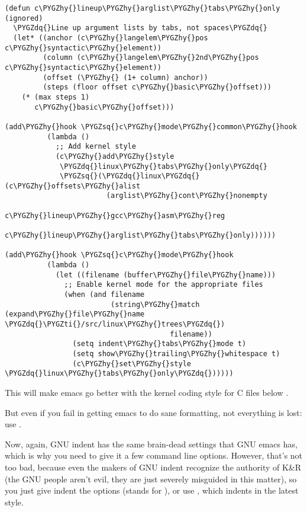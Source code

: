 \documentclass[a4paper,8pt,english]{sphinxmanual}
\def\PYGZhy{\char`\-}
\def\PYGZsq{\char`\'}
\def\PYGZdq{\char`\"}
\def\PYGZti{\char`\~}
\renewcommand\PYGZsq{\textquotesingle}
\begin{document}
\begin{Verbatim}[commandchars=\\\{\}]
(defun c\PYGZhy{}lineup\PYGZhy{}arglist\PYGZhy{}tabs\PYGZhy{}only (ignored)
  \PYGZdq{}Line up argument lists by tabs, not spaces\PYGZdq{}
  (let* ((anchor (c\PYGZhy{}langelem\PYGZhy{}pos c\PYGZhy{}syntactic\PYGZhy{}element))
         (column (c\PYGZhy{}langelem\PYGZhy{}2nd\PYGZhy{}pos c\PYGZhy{}syntactic\PYGZhy{}element))
         (offset (\PYGZhy{} (1+ column) anchor))
         (steps (floor offset c\PYGZhy{}basic\PYGZhy{}offset)))
    (* (max steps 1)
       c\PYGZhy{}basic\PYGZhy{}offset)))

(add\PYGZhy{}hook \PYGZsq{}c\PYGZhy{}mode\PYGZhy{}common\PYGZhy{}hook
          (lambda ()
            ;; Add kernel style
            (c\PYGZhy{}add\PYGZhy{}style
             \PYGZdq{}linux\PYGZhy{}tabs\PYGZhy{}only\PYGZdq{}
             \PYGZsq{}(\PYGZdq{}linux\PYGZdq{} (c\PYGZhy{}offsets\PYGZhy{}alist
                        (arglist\PYGZhy{}cont\PYGZhy{}nonempty
                         c\PYGZhy{}lineup\PYGZhy{}gcc\PYGZhy{}asm\PYGZhy{}reg
                         c\PYGZhy{}lineup\PYGZhy{}arglist\PYGZhy{}tabs\PYGZhy{}only))))))

(add\PYGZhy{}hook \PYGZsq{}c\PYGZhy{}mode\PYGZhy{}hook
          (lambda ()
            (let ((filename (buffer\PYGZhy{}file\PYGZhy{}name)))
              ;; Enable kernel mode for the appropriate files
              (when (and filename
                         (string\PYGZhy{}match (expand\PYGZhy{}file\PYGZhy{}name \PYGZdq{}\PYGZti{}/src/linux\PYGZhy{}trees\PYGZdq{})
                                       filename))
                (setq indent\PYGZhy{}tabs\PYGZhy{}mode t)
                (setq show\PYGZhy{}trailing\PYGZhy{}whitespace t)
                (c\PYGZhy{}set\PYGZhy{}style \PYGZdq{}linux\PYGZhy{}tabs\PYGZhy{}only\PYGZdq{})))))
\end{Verbatim}

This will make emacs go better with the kernel coding style for C
files below .

But even if you fail in getting emacs to do sane formatting, not
everything is lost: use .

Now, again, GNU indent has the same brain-dead settings that GNU emacs
has, which is why you need to give it a few command line options.
However, that's not too bad, because even the makers of GNU indent
recognize the authority of K\&R (the GNU people aren't evil, they are
just severely misguided in this matter), so you just give indent the
options  (stands for ), or use
, which indents in the latest style.
\end{document}
